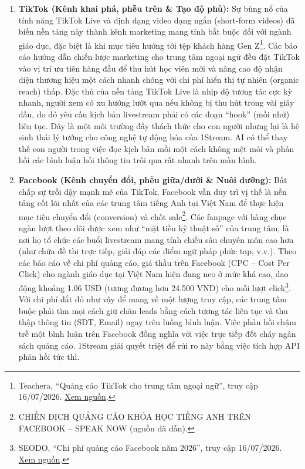 \begin{enumerate}
    \item \textbf{TikTok (Kênh khai phá, phễu trên \& Tạo độ phủ):} Sự bùng nổ của tính năng TikTok Live và định dạng video dạng ngắn (short-form videos) đã biến nền tảng này thành kênh marketing mang tính bắt buộc đối với ngành giáo dục, đặc biệt là khi mục tiêu hướng tới tệp khách hàng Gen Z\footnote{Teachera, ``Quảng cáo TikTok cho trung tâm ngoại ngữ'', truy cập 16/07/2026. \href{https://teachera.edu.vn/dich-vu-quang-cao-tiktok-trung-tam-ngoai-ngu/}{Xem nguồn}.}. Các báo cáo hướng dẫn chiến lược marketing cho trung tâm ngoại ngữ đều đặt TikTok vào vị trí ưu tiên hàng đầu để thu hút học viên mới và nâng cao độ nhận diện thương hiệu một cách nhanh chóng với chi phí hiển thị tự nhiên (organic reach) thấp. Đặc thù của nền tảng TikTok Live là nhịp độ tương tác cực kỳ nhanh, người xem có xu hướng lướt qua nếu không bị thu hút trong vài giây đầu, do đó yêu cầu kịch bản livestream phải có các đoạn ``hook'' (mồi nhử) liên tục. Đây là một môi trường đầy thách thức cho con người nhưng lại là hệ sinh thái lý tưởng cho công nghệ tự động hóa của 1Stream. AI có thể thay thế con người trong việc đọc kịch bản mồi một cách không mệt mỏi và phản hồi các bình luận hỏi thông tin trôi qua rất nhanh trên màn hình.

    \item \textbf{Facebook (Kênh chuyển đổi, phễu giữa/dưới \& Nuôi dưỡng):} Bất chấp sự trỗi dậy mạnh mẽ của TikTok, Facebook vẫn duy trì vị thế là nền tảng cốt lõi nhất của các trung tâm tiếng Anh tại Việt Nam để thực hiện mục tiêu chuyển đổi (conversion) và chốt sale\footnote{CHIẾN DỊCH QUẢNG CÁO KHÓA HỌC TIẾNG ANH TRÊN FACEBOOK -- SPEAK NOW (nguồn đã dẫn).}. Các fanpage với hàng chục ngàn lượt theo dõi được xem như ``mặt tiền kỹ thuật số'' của trung tâm, là nơi họ tổ chức các buổi livestream mang tính chiều sâu chuyên môn cao hơn (như chữa đề thi trực tiếp, giải đáp các điểm ngữ pháp phức tạp, v.v.). Theo các báo cáo về chi phí quảng cáo, giá thầu trên Facebook (CPC -- Cost Per Click) cho ngành giáo dục tại Việt Nam hiện đang neo ở mức khá cao, dao động khoảng 1.06 USD (tương đương hơn 24.500 VNĐ) cho mỗi lượt click\footnote{SEODO, ``Chi phí quảng cáo Facebook năm 2026'', truy cập 16/07/2026. \href{https://seodo.vn/chi-phi-quang-cao-facebook/}{Xem nguồn}.}. Với chi phí đắt đỏ như vậy để mang về một lượng truy cập, các trung tâm buộc phải tìm mọi cách giữ chân leads bằng cách tương tác liên tục và thu thập thông tin (SĐT, Email) ngay trên luồng bình luận. Việc phản hồi chậm trễ một bình luận trên Facebook đồng nghĩa với việc trực tiếp đốt cháy ngân sách quảng cáo. 1Stream giải quyết triệt để rủi ro này bằng việc tích hợp API phản hồi tức thì.


\end{enumerate}
